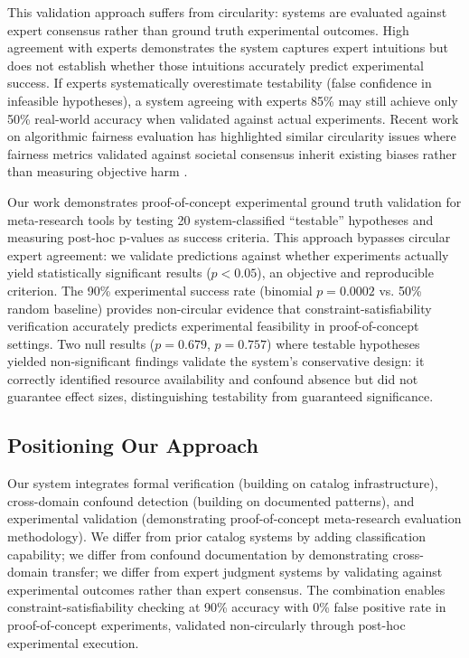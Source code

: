 This validation approach suffers from circularity: systems are evaluated against expert consensus rather than ground truth experimental outcomes. High agreement with experts demonstrates the system captures expert intuitions but does not establish whether those intuitions accurately predict experimental success. If experts systematically overestimate testability (false confidence in infeasible hypotheses), a system agreeing with experts 85\% may still achieve only 50\% real-world accuracy when validated against actual experiments. Recent work on algorithmic fairness evaluation has highlighted similar circularity issues where fairness metrics validated against societal consensus inherit existing biases rather than measuring objective harm \cite{hutchinson2020}.

Our work demonstrates proof-of-concept experimental ground truth validation for meta-research tools by testing 20 system-classified ``testable'' hypotheses and measuring post-hoc p-values as success criteria. This approach bypasses circular expert agreement: we validate predictions against whether experiments actually yield statistically significant results ($p < 0.05$), an objective and reproducible criterion. The 90\% experimental success rate (binomial $p = 0.0002$ vs. 50\% random baseline) provides non-circular evidence that constraint-satisfiability verification accurately predicts experimental feasibility in proof-of-concept settings. Two null results ($p = 0.679$, $p = 0.757$) where testable hypotheses yielded non-significant findings validate the system's conservative design: it correctly identified resource availability and confound absence but did not guarantee effect sizes, distinguishing testability from guaranteed significance.

\subsection{Positioning Our Approach}

Our system integrates formal verification (building on catalog infrastructure), cross-domain confound detection (building on documented patterns), and experimental validation (demonstrating proof-of-concept meta-research evaluation methodology). We differ from prior catalog systems by adding classification capability; we differ from confound documentation by demonstrating cross-domain transfer; we differ from expert judgment systems by validating against experimental outcomes rather than expert consensus. The combination enables constraint-satisfiability checking at 90\% accuracy with 0\% false positive rate in proof-of-concept experiments, validated non-circularly through post-hoc experimental execution.
